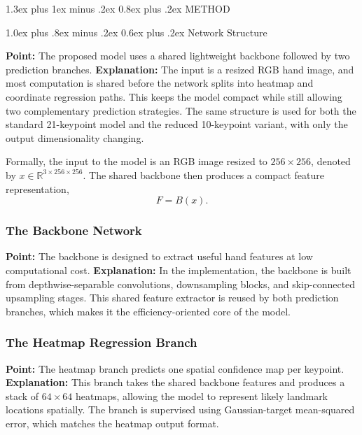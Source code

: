 \documentclass[10pt,letterpaper]{article}
\makeatletter
\renewcommand\section{\@startsection{section}{1}{\z@}%
  {1.3ex plus 1ex minus .2ex}%
  {0.8ex plus .2ex}%
  {\centering\normalfont\small\scshape}}
\renewcommand\subsection{\@startsection{subsection}{2}{\z@}%
  {1.0ex plus .8ex minus .2ex}%
  {0.6ex plus .2ex}%
  {\normalfont\itshape}}
\makeatother
\begin{document}
\section{METHOD}

\subsection{Network Structure}

\noindent\textbf{Point:} The proposed model uses a shared lightweight backbone followed by two prediction branches.  
\textbf{Explanation:} The input is a resized RGB hand image, and most computation is shared before the network splits into heatmap and coordinate regression paths. This keeps the model compact while still allowing two complementary prediction strategies. The same structure is used for both the standard 21-keypoint model and the reduced 10-keypoint variant, with only the output dimensionality changing.

Formally, the input to the model is an RGB image resized to $256 \times 256$, denoted by $x \in \mathbb{R}^{3 \times 256 \times 256}$. The shared backbone then produces a compact feature representation,
\[
F = B(x).
\]

\subsubsection{The Backbone Network}

\noindent\textbf{Point:} The backbone is designed to extract useful hand features at low computational cost.  
\textbf{Explanation:} In the implementation, the backbone is built from depthwise-separable convolutions, downsampling blocks, and skip-connected upsampling stages. This shared feature extractor is reused by both prediction branches, which makes it the efficiency-oriented core of the model.

\subsubsection{The Heatmap Regression Branch}

\noindent\textbf{Point:} The heatmap branch predicts one spatial confidence map per keypoint.  
\textbf{Explanation:} This branch takes the shared backbone features and produces a stack of $64 \times 64$ heatmaps, allowing the model to represent likely landmark locations spatially. The branch is supervised using Gaussian-target mean-squared error, which matches the heatmap output format.
\end{document}

